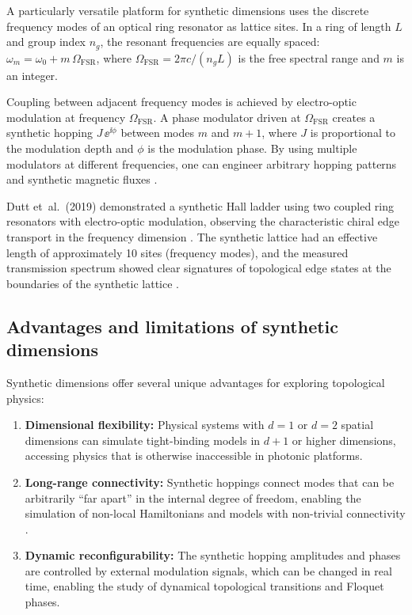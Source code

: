 A particularly versatile platform for synthetic dimensions uses the
discrete frequency modes of an optical ring resonator as lattice
sites.  In a ring of length $L$ and group index $n_g$, the resonant
frequencies are equally spaced: $\omega_m=\omega_0+m\,\Omega_{\mathrm{FSR}}$,
where $\Omega_{\mathrm{FSR}}=2\pi c/(n_g L)$ is the free spectral
range and $m$ is an integer.

Coupling between adjacent frequency modes is achieved by
electro-optic modulation at frequency $\Omega_{\mathrm{FSR}}$.  A
phase modulator driven at $\Omega_{\mathrm{FSR}}$ creates a
synthetic hopping $J\,\ee^{\ii\phi}$ between modes $m$ and $m+1$,
where $J$ is proportional to the modulation depth and $\phi$ is the
modulation phase.  By using multiple modulators at different
frequencies, one can engineer arbitrary hopping patterns and
synthetic magnetic fluxes \cite{ozawa2018topological,yuan2021tutorial}.

Dutt et~al.\ (2019) demonstrated a synthetic Hall ladder using two
coupled ring resonators with electro-optic modulation, observing the
characteristic chiral edge transport in the frequency dimension
\cite{dutt2019experimental}.
The synthetic lattice had an effective length of approximately 10
sites (frequency modes), and the measured transmission spectrum
showed clear signatures of topological edge states at the boundaries
of the synthetic lattice \cite{price2022roadmap}.

\subsection{Advantages and limitations of synthetic dimensions}
\label{sec:ch16-advantages}

Synthetic dimensions offer several unique advantages for exploring
topological physics:
\begin{enumerate}
  \item \textbf{Dimensional flexibility:} Physical systems with
    $d=1$ or $d=2$ spatial dimensions can simulate tight-binding
    models in $d+1$ or higher dimensions, accessing physics that
    is otherwise inaccessible in photonic platforms.
  \item \textbf{Long-range connectivity:} Synthetic hoppings
    connect modes that can be arbitrarily ``far apart'' in the
    internal degree of freedom, enabling the simulation of
    non-local Hamiltonians and models with non-trivial connectivity
    \cite{ozawa2018topological}.
  \item \textbf{Dynamic reconfigurability:} The synthetic hopping
    amplitudes and phases are controlled by external modulation
    signals, which can be changed in real time, enabling the study
    of dynamical topological transitions and Floquet phases.
\end{enumerate}

